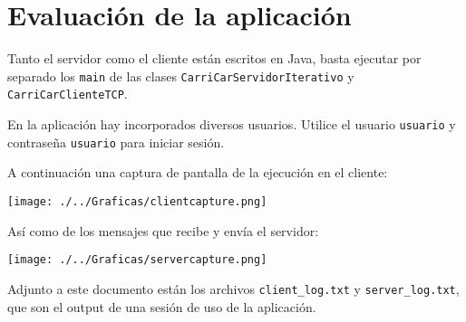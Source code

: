 \documentclass[10pt, a4paper]{article}
\theoremstyle{theorem-style}
\theoremstyle{theorem-style}
\theoremstyle{definition-style}
\theoremstyle{remark-style}
\theoremstyle{example-style}
\theoremstyle{definition-style}
\theoremstyle{remark-style}
\begin{document}
\pagebreak

\part{Evaluación de la aplicación}

Tanto el servidor como el cliente están escritos en Java, basta ejecutar por separado los \texttt{main} de las clases \texttt{CarriCarServidorIterativo} y \texttt{CarriCarClienteTCP}.

En la aplicación hay incorporados diversos usuarios. Utilice el usuario \texttt{usuario} y contraseña \texttt{usuario} para iniciar sesión.

A continuación una captura de pantalla de la ejecución en el cliente:

\texttt{[image: ./../Graficas/clientcapture.png]}

\pagebreak
Así como de los mensajes que recibe y envía el servidor:

\texttt{[image: ./../Graficas/servercapture.png]}

Adjunto a este documento están los archivos \texttt{client\_log.txt} y \texttt{server\_log.txt}, que son el output de una sesión de uso de la aplicación.
\end{document}
